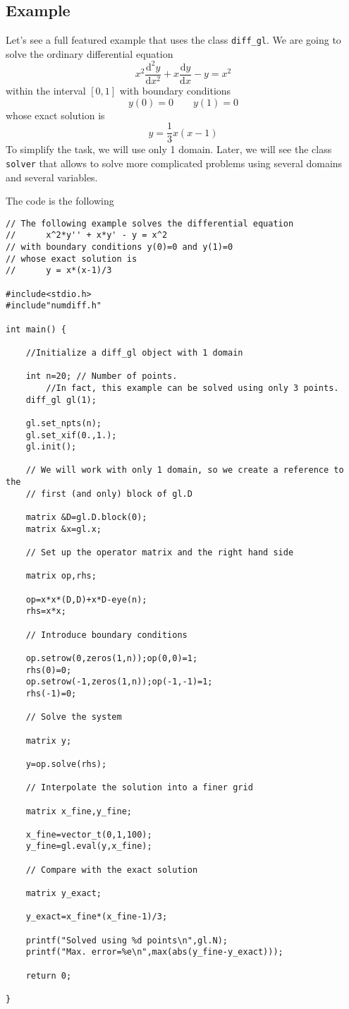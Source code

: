 \subsection{Example}

Let's see a full featured example that uses the class \texttt{diff\_gl}.
We are going to solve the ordinary differential equation
$$x^2\frac{\mathrm{d}^2y}{\mathrm{d}x^2}+x\frac{\mathrm{d}y}{\mathrm{d}x}-y=x^2$$
within the interval $[0,1]$ with boundary conditions
$$y(0)=0 \qquad y(1)=0$$
whose exact solution is
$$y=\frac{1}{3}x(x-1)$$
To simplify the task, we will use only 1 domain. Later, we will see the class \texttt{solver} that
allows to solve more complicated problems using several domains and several variables.

The code is the following

\begin{verbatim}
// The following example solves the differential equation
//		x^2*y'' + x*y' - y = x^2
// with boundary conditions y(0)=0 and y(1)=0
// whose exact solution is
//      y = x*(x-1)/3		

#include<stdio.h>
#include"numdiff.h"

int main() {
	
	//Initialize a diff_gl object with 1 domain 

	int n=20; // Number of points. 
		//In fact, this example can be solved using only 3 points.
	diff_gl gl(1);
	
	gl.set_npts(n);
	gl.set_xif(0.,1.);
	gl.init();
	
	// We will work with only 1 domain, so we create a reference to the 
	// first (and only) block of gl.D
	
	matrix &D=gl.D.block(0);
	matrix &x=gl.x;
	
	// Set up the operator matrix and the right hand side
	
	matrix op,rhs;
	
	op=x*x*(D,D)+x*D-eye(n);
	rhs=x*x;
	
	// Introduce boundary conditions
	
	op.setrow(0,zeros(1,n));op(0,0)=1;
	rhs(0)=0;
	op.setrow(-1,zeros(1,n));op(-1,-1)=1;
	rhs(-1)=0;
	
	// Solve the system
	
	matrix y;
	
	y=op.solve(rhs);
	
	// Interpolate the solution into a finer grid
	
	matrix x_fine,y_fine;
	
	x_fine=vector_t(0,1,100);
	y_fine=gl.eval(y,x_fine);
	
	// Compare with the exact solution
	
	matrix y_exact;
	
	y_exact=x_fine*(x_fine-1)/3;
	
	printf("Solved using %d points\n",gl.N);
	printf("Max. error=%e\n",max(abs(y_fine-y_exact)));
	
	return 0;	
	
}
\end{verbatim}

